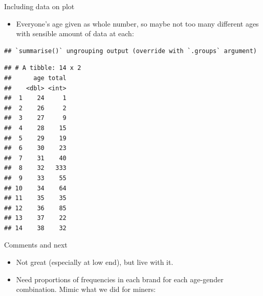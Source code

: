 \documentclass[
  ignorenonframetext,
]{beamer}
\newenvironment{Shaded}{\begin{snugshade}}{\end{snugshade}}
\newcommand{\DataTypeTok}[1]{\textcolor[rgb]{0.13,0.29,0.53}{#1}}
\newcommand{\KeywordTok}[1]{\textcolor[rgb]{0.13,0.29,0.53}{\textbf{#1}}}
\newcommand{\NormalTok}[1]{#1}
\newcommand{\OperatorTok}[1]{\textcolor[rgb]{0.81,0.36,0.00}{\textbf{#1}}}
\newcommand{\StringTok}[1]{\textcolor[rgb]{0.31,0.60,0.02}{#1}}
\providecommand{\tightlist}{%
  \setlength{\itemsep}{0pt}\setlength{\parskip}{0pt}}
\begin{document}
\begin{frame}[fragile]{Including data on plot}
\protect\hypertarget{including-data-on-plot}{}

\begin{itemize}
\tightlist
\item
  Everyone's age given as whole number, so maybe not too many different
  ages with sensible amount of data at each:
\end{itemize}

\scriptsize

\begin{Shaded}
\end{Shaded}

\begin{verbatim}
## `summarise()` ungrouping output (override with `.groups` argument)
\end{verbatim}

\begin{verbatim}
## # A tibble: 14 x 2
##      age total
##    <dbl> <int>
##  1    24     1
##  2    26     2
##  3    27     9
##  4    28    15
##  5    29    19
##  6    30    23
##  7    31    40
##  8    32   333
##  9    33    55
## 10    34    64
## 11    35    35
## 12    36    85
## 13    37    22
## 14    38    32
\end{verbatim}

\normalsize

\end{frame}

\begin{frame}[fragile]{Comments and next}
\protect\hypertarget{comments-and-next}{}

\begin{itemize}
\item
  Not great (especially at low end), but live with it.
\item
  Need proportions of frequencies in each brand for each age-gender
  combination. Mimic what we did for miners:
\end{itemize}

\begin{Shaded}
\end{Shaded}

\end{frame}
\end{document}
